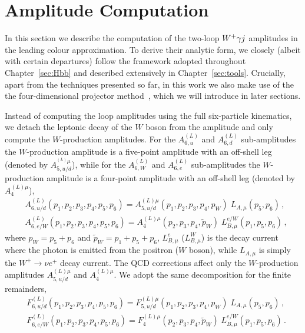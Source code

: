 \documentclass[main.tex]{subfiles}
\begin{document}
\section{Amplitude Computation}
\label{wyjsec:reduction}
In this section we describe the computation of the two-loop $W^+\gamma j$ amplitudes in the leading colour approximation.
To derive their analytic form, we closely (albeit with certain departures) follow the framework adopted throughout Chapter~\ref{sec:Hbb} and described extensively in Chapter~\ref{sec:tools}. Crucially, apart from the techniques presented so far, in this work we also make use of the the four-dimensional projector method~\cite{Peraro:2019cjj,Peraro:2020sfm}, which we will introduce in later sections.

Instead of computing the loop amplitudes using the full six-particle kinematics, 
we detach the leptonic decay of the $W$ boson from the amplitude and only compute the $W$-production amplitudes.
For the $A^{(L)}_{6,u}$ and $A^{(L)}_{6,d}$ sub-amplitudes the $W$-production amplitude is a five-point amplitude with an off-shell leg (denoted by  $A_{5,u/d}^{^{(L)}\mu}$),
while for the $A^{(L)}_{6,W}$ and $A^{(L)}_{6,e}$ sub-amplitudes the $W$-production amplitude is a four-point amplitude with an off-shell leg (denoted by $A_{4}^{{(L)}\mu}$),
\begin{align}
& A^{(L)}_{6,u/d}(p_1,p_2,p_3,p_4,p_5,p_6) = A_{5,u/d}^{(L)\mu}(p_1,p_2,p_3,p_4,p_W) \; L_{A,\mu}(p_5,p_6) \,, \label{Wyjeq:decayA}\\
& A^{(L)}_{6,e/W}(p_1,p_2,p_3,p_4,p_5,p_6) = A_{4}^{(L)\mu}(p_2,p_3,p_4,\tilde{p}_W) \; L^{e/W}_{B,\mu}(p_1,p_5,p_6) \,, \label{Wyjeq:decayB}
\end{align}
where $p_W = p_5 + p_6$ and  $\tilde{p}_W = p_1 + p_5 + p_6$,
$L^{e}_{B,\mu}$ ($L^{W}_{B,\mu}$) is the decay current where the photon is emitted from the positron ($W$ boson), while $L_{A,\mu}$ is simply the $W^+ \to \nu e^+$ decay current.
The QCD corrections affect only the $W$-production amplitudes $A_{5,u/d}^{(L)\mu}$ and $A_{4}^{(L)\mu}$. We adopt the same decomposition for the finite remainders,
\begin{align}
& F^{(L)}_{6,u/d}(p_1,p_2,p_3,p_4,p_5,p_6) = F_{5,u/d}^{(L)\mu}(p_1,p_2,p_3,p_4,p_W) \; L_{A,\mu}(p_5,p_6) \,, \label{Wyjeq:decayAF}\\
& F^{(L)}_{6,e/W}(p_1,p_2,p_3,p_4,p_5,p_6) = F_{4}^{(L)\mu}(p_2,p_3,p_4,\tilde{p}_W) \; L^{e/W}_{B,\mu}(p_1,p_5,p_6) \,. \label{Wyjeq:decayBF}
\end{align}
\end{document}
